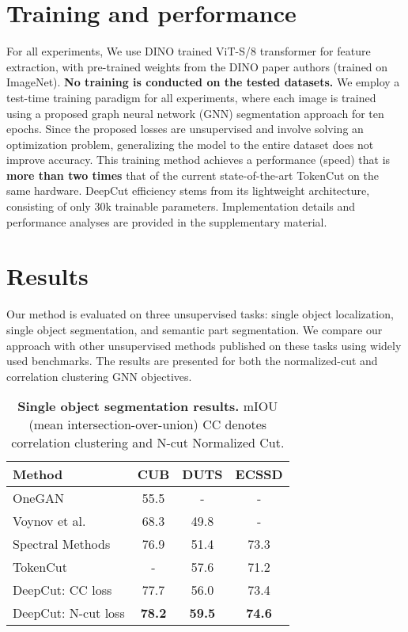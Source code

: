 \documentclass[10pt,twocolumn,letterpaper]{article}
\begin{document}
\section{Training and performance}
For all experiments, We use DINO \cite{caron2021emerging} trained ViT-S/8 transformer for feature extraction, with pre-trained weights from the DINO paper authors (trained on ImageNet\cite{ILSVRC15}). 
 \textbf{No training is conducted on the tested datasets.}
We employ a test-time training paradigm for all experiments, where each image is trained using a proposed graph neural network (GNN) segmentation approach for ten epochs. Since the proposed losses are unsupervised and involve solving an optimization problem, generalizing the model to the entire dataset does not improve accuracy. This training method achieves a performance (speed) that is \textbf{more than two times} that of the current state-of-the-art TokenCut\cite{wang2022self} on the same hardware. DeepCut efficiency stems from its lightweight architecture, consisting of only 30k trainable parameters. Implementation details and performance analyses are provided in the supplementary material.
 
\section{Results}\label{sec:results}
Our method is evaluated on three unsupervised tasks: single object localization, single object segmentation, and semantic part segmentation. We compare our approach with other unsupervised methods published on these tasks using widely used benchmarks. The results are presented for both the normalized-cut and correlation clustering GNN objectives.



\begin{table}
  \centering
  \begin{tabular}{@{}lc c c@{}}
    \toprule
    Method & CUB &  DUTS & ECSSD\\
    \midrule
    OneGAN\cite{benny2020onegan} & 55.5 & -  & -\\
    Voynov et al.\cite{voynov2021object} & 68.3 & 49.8& - \\
    Spectral Methods\cite{melas2022deep} & 76.9 &  51.4 & 73.3\\
    TokenCut\cite{wang2022self} & - &  57.6& 71.2\\
    \midrule
    DeepCut: CC loss&77.7 & 56.0 & 73.4\\
    DeepCut: N-cut loss&\textbf{78.2} & \textbf{59.5} & \textbf{74.6}\\
    \bottomrule
  \end{tabular}
  \caption{\textbf{Single object segmentation results.} mIOU (mean intersection-over-union) CC denotes correlation clustering and N-cut Normalized Cut.}
  \label{tab:obseg}
\end{table}
\end{document}

